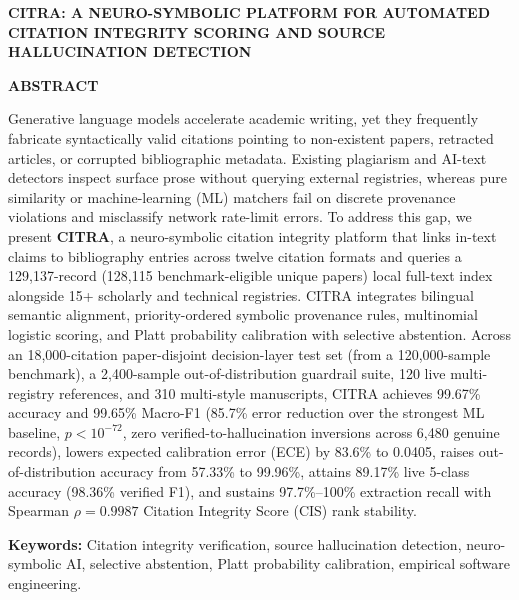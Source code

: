 \clearpage
\pagestyle{empty}
{\centering
\thispagestyle{empty}
\linespread{1.15}\fontsize{16pt}{22pt}\selectfont\textbf{CITRA: A NEURO-SYMBOLIC PLATFORM FOR AUTOMATED CITATION INTEGRITY SCORING AND SOURCE HALLUCINATION DETECTION}\par}

\vspace{0.45\baselineskip}

{\centering\linespread{1.15}\fontsize{16pt}{22pt}\selectfont\textbf{ABSTRACT}\par}

\vspace{0.55\baselineskip}
\thispagestyle{empty}

Generative language models accelerate academic writing, yet they frequently fabricate syntactically valid citations pointing to non-existent papers, retracted articles, or corrupted bibliographic metadata. Existing plagiarism and AI-text detectors inspect surface prose without querying external registries, whereas pure similarity or machine-learning (ML) matchers fail on discrete provenance violations and misclassify network rate-limit errors. To address this gap, we present \textbf{CITRA}, a neuro-symbolic citation integrity platform that links in-text claims to bibliography entries across twelve citation formats and queries a 129,137-record (128,115 benchmark-eligible unique papers) local full-text index alongside 15+ scholarly and technical registries. CITRA integrates bilingual semantic alignment, priority-ordered symbolic provenance rules, multinomial logistic scoring, and Platt probability calibration with selective abstention. Across an 18,000-citation paper-disjoint decision-layer test set (from a 120,000-sample benchmark), a 2,400-sample out-of-distribution guardrail suite, 120 live multi-registry references, and 310 multi-style manuscripts, CITRA achieves 99.67\% accuracy and 99.65\% Macro-F1 (85.7\% error reduction over the strongest ML baseline, $p < 10^{-72}$, zero verified-to-hallucination inversions across 6,480 genuine records), lowers expected calibration error (ECE) by 83.6\% to 0.0405, raises out-of-distribution accuracy from 57.33\% to 99.96\%, attains 89.17\% live 5-class accuracy (98.36\% verified F1), and sustains 97.7\%--100\% extraction recall with Spearman $\rho = 0.9987$ Citation Integrity Score (CIS) rank stability.

\vspace{0.45\baselineskip}
\noindent\textbf{Keywords:} Citation integrity verification, source hallucination detection, neuro-symbolic AI, selective abstention, Platt probability calibration, empirical software engineering.
\clearpage
